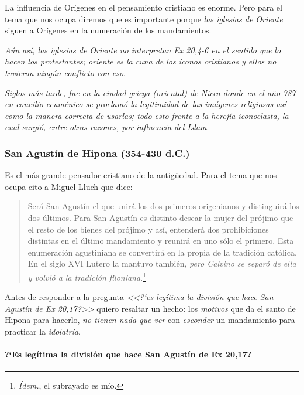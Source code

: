 \documentclass{article}
\begin{document}
La influencia de Or\'{i}genes en el pensamiento cristiano es enorme. Pero para el tema que nos ocupa diremos que es importante porque \emph{las iglesias de Oriente} siguen a Or\'{i}genes en la numeraci\'on de los mandamientos.

\emph{A\'un as\'{i}, las iglesias de Oriente no interpretan Ex 20,4-6 en el sentido que lo hacen los protestantes; oriente es la cuna de los \'{i}conos cristianos y ellos no tuvieron ning\'un conflicto con eso}. 

\emph{Siglos m\'as tarde, fue en la ciudad griega (oriental) de Nicea donde en el a\~no 787 en concilio ecum\'enico se proclam\'o la legitimidad de las im\'agenes religiosas as\'{i} como la manera correcta de usarlas; todo esto frente a la herej\'{i}a iconoclasta, la cual surgi\'o, entre otras razones, por influencia del Islam}.

\subsubsection{San Agust\'{i}n de Hipona (354-430 d.C.)}

Es el m\'as grande pensador cristiano de la antig\"uedad. Para el tema que nos ocupa cito a Miguel Lluch que dice:

\begin{quote}
Será San Agustín el que unirá los dos primeros origenianos
y distinguirá los dos últimos. Para San Agustín es distinto desear
la mujer del prójimo que el resto de los bienes del prójimo y así, entenderá
dos prohibiciones distintas en el último mandamiento y reunirá en uno
sólo el primero. Esta enumeración agustiniana se convertirá en la propia
de la tradición católica. En el siglo XVI Lutero la mantuvo también, \emph{pero
Calvino se separó de ella y volvió a la tradición flloniana}.\footnote{\emph{\'{I}dem.}, el subrayado es m\'{i}o.}
\end{quote}

\noindent
Antes de responder a la pregunta \emph{<<?`es leg\'{i}tima la divisi\'on que hace San Agust\'{i}n de Ex 20,17?>>} quiero resaltar un hecho: los \emph{motivos} que da el santo de Hipona para hacerlo, \emph{no tienen nada que ver} con \emph{esconder} un mandamiento para practicar la \emph{idolatr\'{i}a}.

\paragraph{?`Es leg\'{i}tima la divisi\'on que hace San Agust\'{i}n de Ex 20,17?}
\end{document}
